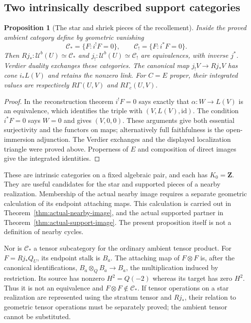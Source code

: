 \documentclass[11pt]{article}
\newtheorem{proposition}[theorem]{Proposition}
\theoremstyle{definition}
\theoremstyle{remark}
\begin{document}
\subsection{Two intrinsically described support categories}
\begin{proposition}[The star and shriek pieces of the recollement]
\label{prop:clean-pieces}
Inside the proved ambient category define by geometric vanishing
\[
 \mathcal C_* =\{F:i^!F=0\},\qquad
 \mathcal C_! =\{F:i^*F=0\}.
\]
Then $Rj_*:\mathcal U^b(U)\simeq\mathcal C_*$ and
$j_!:\mathcal U^b(U)\simeq\mathcal C_!$ are equivalences, with inverse
$j^*$.  Verdier duality exchanges these categories.  The canonical map
$j_!V\to Rj_*V$ has cone $i_*L(V)$ and retains the nonzero link.
For $C=E$ proper, their integrated values are respectively
$R\Gamma(U,V)$ and $R\Gamma_c(U,V)$.
\end{proposition}
\begin{proof}
In the reconstruction theorem $i^!F=0$ says exactly that
$\alpha:W\to L(V)$ is an equivalence, which identifies the triple
with $(V,L(V),\mathrm{id})$.  The condition $i^*F=0$ says $W=0$
and gives $(V,0,0)$.  These arguments give both essential surjectivity
and the functors on maps; alternatively full faithfulness is the
open-immersion adjunction.  The Verdier exchanges and the displayed
localization triangle were proved above.  Properness of $E$ and
composition of direct images give the integrated identities.
\end{proof}
These are intrinsic categories on a fixed algebraic pair, and each has
$K_0=\mathbf Z$.  They are useful candidates for the star and supported
pieces of a nearby realization.  Membership of the actual nearby image requires a separate geometric
calculation of its endpoint attaching maps.  This calculation is carried
out in Theorem~\ref{thm:actual-nearby-image}, and the actual supported
partner in Theorem~\ref{thm:actual-support-image}.  The present
proposition itself is not a definition of nearby cycles.

Nor is $\mathcal C_*$ a tensor subcategory for the ordinary ambient
tensor product.  For $F=Rj_*Q_U$, its endpoint stalk is $B_a$.  The
attaching map of $F\otimes F$ is, after the canonical identifications,
$B_a\otimes_Q B_a\to B_a$, the multiplication induced by restriction.
Its source has nonzero $H^2=Q(-2)$ whereas its target has zero $H^2$.
Thus it is not an equivalence and $F\otimes F\notin\mathcal C_*$.
If tensor operations on a star realization are represented using the
stratum tensor and $Rj_*$, their relation to geometric tensor operations
must be separately proved; the ambient tensor cannot be substituted.
\end{document}
